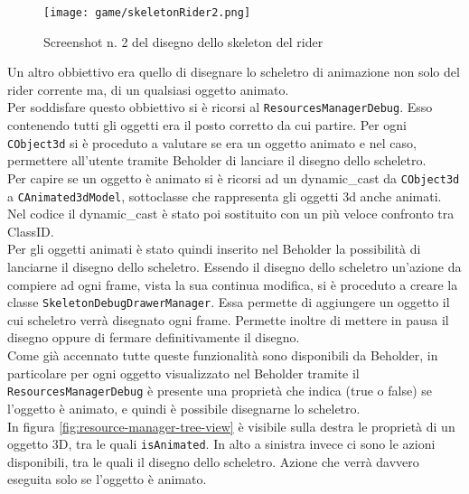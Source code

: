 	\begin{figure}[h!] 
		\centering 
		\hspace*{-0.05\columnwidth}\texttt{[image: game/skeletonRider2.png]} 
		\caption{Screenshot n. 2 del disegno dello skeleton del rider}
	\end{figure}
	
	Un altro obbiettivo era quello di disegnare lo scheletro di animazione non solo del rider corrente ma, di un qualsiasi oggetto animato.\\
	
	Per soddisfare questo obbiettivo si è ricorsi al \texttt{ResourcesManagerDebug}. Esso contenendo tutti gli oggetti era il posto corretto da cui partire. Per ogni \texttt{CObject3d} si è proceduto a valutare se era un oggetto animato e nel caso, permettere all'utente tramite Beholder di lanciare il disegno dello scheletro.\\
	
	Per capire se un oggetto è animato si è ricorsi ad un dynamic\_cast da \texttt{CObject3d} a \texttt{CAnimated3dModel}, sottoclasse che rappresenta gli oggetti 3d anche animati. Nel codice il dynamic\_cast è stato poi sostituito con un più veloce confronto tra ClassID.\\
	
	Per gli oggetti animati è stato quindi inserito nel Beholder la possibilità di lanciarne il disegno dello scheletro. Essendo il disegno dello scheletro un'azione da compiere ad ogni frame, vista la sua continua modifica, si è proceduto a creare la classe \texttt{SkeletonDebugDrawerManager}. Essa permette di aggiungere un oggetto il cui scheletro verrà disegnato ogni frame. Permette inoltre di mettere in pausa il disegno oppure di fermare definitivamente il disegno.\\
	
	Come già accennato tutte queste funzionalità sono disponibili da Beholder, in particolare per ogni oggetto visualizzato nel Beholder tramite il \texttt{ResourcesManagerDebug} è presente una proprietà che indica (true o false) se l'oggetto è animato, e quindi è possibile disegnarne lo scheletro.\\
	
	In figura \ref{fig:resource-manager-tree-view} è visibile sulla destra le proprietà di un oggetto 3D, tra le quali \texttt{isAnimated}. In alto a sinistra invece ci sono le azioni disponibili, tra le quali il disegno dello scheletro. Azione che verrà davvero eseguita solo se l'oggetto è animato.
	
